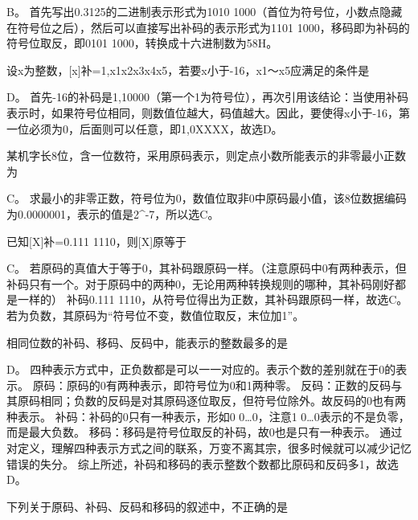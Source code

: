\begin{solution}B。 首先写出0.3125的二进制表示形式为1010
1000（首位为符号位，小数点隐藏在符号位之后），然后可以直接写出补码的表示形式为1101
1000，移码即为补码的符号位取反，即0101 1000，转换成十六进制数为58H。
\end{solution}
\question 设x为整数，{[}x{]}补=1,x1x2x3x4x5，若要x小于-16，x1～x5应满足的条件是
\par{}
\begin{solution}D。
首先-16的补码是1,10000（第一个1为符号位），再次引用该结论：当使用补码表示时，如果符号位相同，则数值位越大，码值越大。因此，要使得x小于-16，第一位必须为0，后面则可以任意，即1,0XXXX，故选D。
\end{solution}
\question 某机字长8位，含一位数符，采用原码表示，则定点小数所能表示的非零最小正数为
\par\fourch{}{}{\textcolor{red}{}}{}
\begin{solution}C。
求最小的非零正数，符号位为0，数值位取非0中原码最小值，该8位数据编码为0.0000001，表示的值是2\^{}-7，所以选C。
\end{solution}
\question 已知{[}X{]}补=0.111 1110，则{[}X{]}原等于
\par{}
\begin{solution}C。
若原码的真值大于等于0，其补码跟原码一样。（注意原码中0有两种表示，但补码只有一个。对于原码中的两种0，无论用两种转换规则的哪种，其补码刚好都是一样的）
补码0.111 1110，从符号位得出为正数，其补码跟原码一样，故选C。
若为负数，其原码为``符号位不变，数值位取反，末位加1''。
\end{solution}
\question 相同位数的补码、移码、反码中，能表示的整数最多的是
\par{}
\begin{solution}D。
四种表示方式中，正负数都是可以一一对应的。表示个数的差别就在于0的表示。
原码：原码的0有两种表示，即符号位为0和1两种零。
反码：正数的反码与其原码相同；负数的反码是对其原码逐位取反，但符号位除外。故反码的0也有两种表示。
补码：补码的0只有一种表示，形如0 0\ldots{}0，注意1
0\ldots{}0表示的不是负零，而是最大负数。
移码：移码是符号位取反的补码，故0也是只有一种表示。
通过对定义，理解四种表示方式之间的联系，万变不离其宗，很多时候就可以减少记忆错误的失分。
综上所述，补码和移码的表示整数个数都比原码和反码多1，故选D。
\end{solution}
\question 下列关于原码、补码、反码和移码的叙述中，不正确的是
